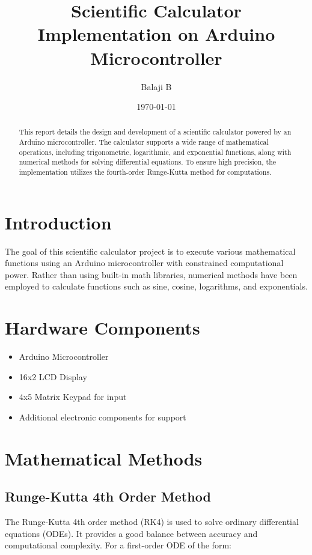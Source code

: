 \documentclass[12pt,a4paper]{article}
\title{Scientific Calculator Implementation on Arduino Microcontroller}
\author{Balaji B}
\date{\today}
\begin{document}
\maketitle

\begin{abstract}
This report details the design and development of a scientific calculator powered by an Arduino microcontroller. The calculator supports a wide range of mathematical operations, including trigonometric, logarithmic, and exponential functions, along with numerical methods for solving differential equations. To ensure high precision, the implementation utilizes the fourth-order Runge-Kutta method for computations.
\end{abstract}

\tableofcontents

\section{Introduction}
The goal of this scientific calculator project is to execute various mathematical functions using an Arduino microcontroller with constrained computational power. Rather than using built-in math libraries, numerical methods have been employed to calculate functions such as sine, cosine, logarithms, and exponentials.

\section{Hardware Components}
\begin{itemize}
    \item Arduino Microcontroller 
    \item 16x2 LCD Display
    \item 4x5 Matrix Keypad for input
    \item Additional electronic components for support
\end{itemize}

\section{Mathematical Methods}

\subsection{Runge-Kutta 4th Order Method}
The Runge-Kutta 4th order method (RK4) is used to solve ordinary differential equations (ODEs). It provides a good balance between accuracy and computational complexity. For a first-order ODE of the form:
\end{document}
